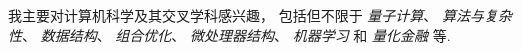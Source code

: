

我主要对计算机科学及其交叉学科感兴趣，
包括但不限于
\textit{量子计算}、
\textit{算法与复杂性}、
\textit{数据结构}、
\textit{组合优化}、
\textit{微处理器结构}、
\textit{机器学习}
和
\textit{量化金融}
等.

\endinput